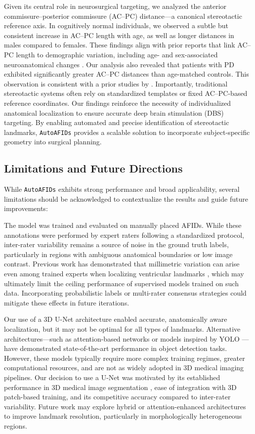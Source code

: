 Given its central role in neurosurgical targeting, we analyzed the anterior commissure–posterior commissure (AC–PC) distance—a canonical stereotactic reference axis. In cognitively normal individuals, we observed a subtle but consistent increase in AC–PC length with age, as well as longer distances in males compared to females. These findings align with prior reports that link AC–PC length to demographic variation, including age- and sex-associated neuroanatomical changes \cite{Lee2008-nd}. Our analysis also revealed that patients with PD exhibited significantly greater AC–PC distances than age-matched controls. This observation is consistent with a prior studies by \cite{Lee2008-nd,Dabadi2020-am}. Importantly, traditional stereotactic systems often rely on standardized templates or fixed AC–PC-based reference coordinates. Our findings reinforce the necessity of individualized anatomical localization to ensure accurate deep brain stimulation (DBS) targeting. By enabling automated and precise identification of stereotactic landmarks, \texttt{AutoAFIDs} provides a scalable solution to incorporate subject-specific geometry into surgical planning.

\subsection{Limitations and Future Directions}

While \texttt{AutoAFIDs} exhibits strong performance and broad applicability, several limitations should be acknowledged to contextualize the results and guide future improvements:

The model was trained and evaluated on manually placed AFIDs. While these annotations were performed by expert raters following a standardized protocol, inter-rater variability remains a source of noise in the ground truth labels, particularly in regions with ambiguous anatomical boundaries or low image contrast. Previous work has demonstrated that millimetric variation can arise even among trained experts when localizing ventricular landmarks \cite{Lau2019-eh,Abbass2022-lf}, which may ultimately limit the ceiling performance of supervised models trained on such data. Incorporating probabilistic labels or multi-rater consensus strategies could mitigate these effects in future iterations.

Our use of a 3D U-Net architecture enabled accurate, anatomically aware localization, but it may not be optimal for all types of landmarks. Alternative architectures—such as attention-based networks or models inspired by YOLO \cite{Redmon2015-ia}—have demonstrated state-of-the-art performance in object detection tasks. However, these models typically require more complex training regimes, greater computational resources, and are not as widely adopted in 3D medical imaging pipelines. Our decision to use a U-Net was motivated by its established performance in 3D medical image segmentation \cite{Cicek2016-dz}, ease of integration with 3D patch-based training, and its competitive accuracy compared to inter-rater variability. Future work may explore hybrid or attention-enhanced architectures to improve landmark resolution, particularly in morphologically heterogeneous regions.

